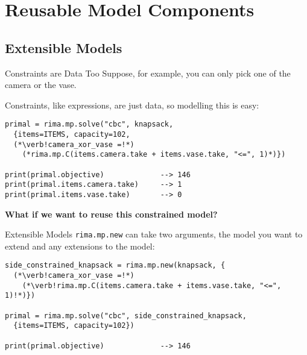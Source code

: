 \documentclass[smaller]{beamer}
\begin{document}

\section{Reusable Model Components}
\begin{comment}
\begin{frame}{Reusable Model Components}
  With Rima we can build a model from parts by:
  \begin{itemize}
    \item Configuring an existing model
    \item Extending an existing model
    \item Including an existing model, perhaps more than once
 \end{itemize}
\end{frame}
\end{comment}

\subsection{Extensible Models}
\begin{frame}[fragile]{Constraints are Data Too}
  Suppose, for example, you can only pick one of the camera or the vase.\\

  Constraints, like expressions, are just data, so modelling this is easy:
  \begin{lstlisting}
primal = rima.mp.solve("cbc", knapsack,
  {items=ITEMS, capacity=102,
  (*\verb!camera_xor_vase =!*)
    (*rima.mp.C(items.camera.take + items.vase.take, "<=", 1)*)})
  
print(primal.objective)             --> 146
print(primal.items.camera.take)     --> 1
print(primal.items.vase.take)       --> 0
  \end{lstlisting}
  \bf{What if we want to reuse this constrained model?}
\end{frame}


\begin{frame}[fragile]{Extensible Models}
  \lstinline!rima.mp.new! can take two arguments,
  the model you want to extend
  and any extensions to the model:
  \begin{lstlisting}
side_constrained_knapsack = rima.mp.new(knapsack, {
  (*\verb!camera_xor_vase =!*)
    (*\verb!rima.mp.C(items.camera.take + items.vase.take, "<=", 1)!*)})

primal = rima.mp.solve("cbc", side_constrained_knapsack,
  {items=ITEMS, capacity=102})

print(primal.objective)             --> 146
  \end{lstlisting}
\end{frame}
\end{document}

